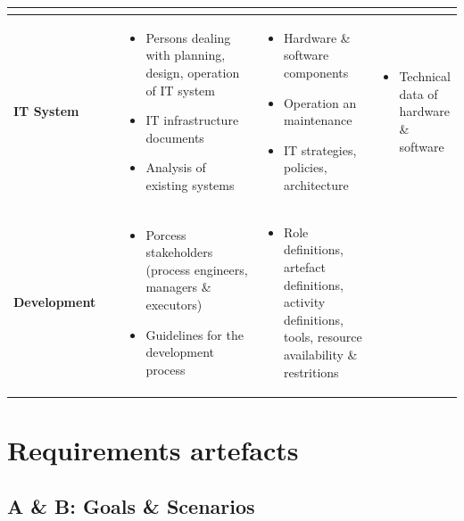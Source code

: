 \documentclass{article}
\begin{document}
\begin{adjustbox}{center}
\begin{tabular}{p{0.3\linewidth}|p{0.4\linewidth}|p{0.4\linewidth}|p{0.4\linewidth}|}
\begin{itemize}[leftmargin=*]
\end{itemize}
\\ \hline
\vspace{1.2cm}\textbf{IT System} &
\begin{itemize}[leftmargin=*] 
\item Persons dealing with planning, design, operation of IT system
\item IT infrastructure documents
\item Analysis of existing systems
\end{itemize}
&
\begin{itemize}[leftmargin=*] 
\item Hardware \& software components
\item Operation an maintenance
\item IT strategies, policies, architecture
\end{itemize}
&  
\begin{itemize}[leftmargin=*] 
\item Technical data of hardware \& software
\end{itemize}
\\ \hline
\vspace{1.2cm}\textbf{Development} & 
\begin{itemize}[leftmargin=*] 
\item Porcess stakeholders (process engineers, managers \& executors)
\item Guidelines for the development process
\end{itemize}
& 
\begin{itemize}[leftmargin=*] 
\item Role definitions, artefact definitions, activity definitions, tools, resource availability \& restritions
\end{itemize}
&  \\ \hline
\end{tabular}
\end{adjustbox}

\newpage

\section{Requirements artefacts}

\subsection*{A \& B: Goals \& Scenarios}
\end{document}
